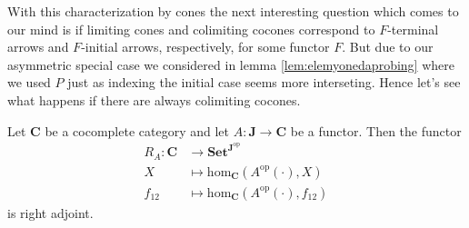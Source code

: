 With this characterization by cones the next interesting question which comes to our mind is if limiting cones and colimiting cocones correspond to $F$-terminal arrows and $F$-initial arrows, respectively, for some functor $F$. But due to our asymmetric special case we considered in lemma \ref{lem:elemyonedaprobing} where we used $P$ just as indexing the initial case seems more interseting. Hence let's see what happens if there are always colimiting cocones.
\\
\begin{thm}
\label{thm:initprobisinitcone}
Let $\mathbf{C}$ be a cocomplete category and let $A \colon \mathbf{J} \rightarrow \mathbf{C}$ be a functor. Then the functor
\begin{align*}
  R_{A}
  \colon
  \mathbf{C}
  &\rightarrow
  \mathbf{Set}^{\mathbf{J}^{\textrm{op}}}
  \\
  X
  &\mapsto
  \mathrm{hom}_{\mathbf{C}}
  \left(
    A^{\textrm{op}}(\cdot),
    X
  \right)
  \\
  f_{12}
  &\mapsto
  \mathrm{hom}_{\mathbf{C}}
  \left(
    A^{\textrm{op}}(\cdot),
    f_{12}
  \right)
\end{align*}
is right adjoint.
\end{thm}
